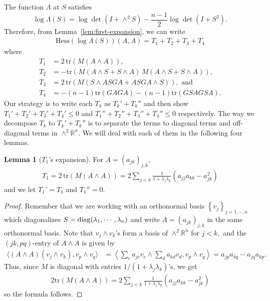 \documentclass[11pt]{amsart}
\numberwithin{equation}{section}
\theoremstyle{definition}
\theoremstyle{definition}
\newtheorem{lemma}[equation]{Lemma}
\newcommand{\pair}[1]{\langle #1\rangle}
\newcommand{\set}[1]{\left\{#1\right\}}
\newcommand{\ppair}[1]{\left\langle #1\right\rangle}
\newcommand{\pr}[1]{\left(#1\right)}
\newcommand{\bb}[1]{\mathbb{#1}} \newcommand{\td}[1]{\widetilde{#1}}
\newcommand{\tr}{\text{tr}}
\newcommand{\Hess}{\text{Hess}}
\begin{document}
The function $\Lambda$ at $S$ satisfies
\[\log \Lambda(S)
= \log \det (I+\wedge^2S)-\frac{n-1}{2}\log\det(I+S^2)
.\]
Therefore, from Lemma~\ref{lem:first-expansion}, we can write
\begin{align*}
\Hess\pr{\log \Lambda(S)}(A, A)=T_1+T_2+T_3+T_4
\end{align*} 
where 
\begin{equation}\label{T-1-T-4}
\begin{split}
T_1
&= 2\,\tr\pr{M (A\wedge A)},\\
T_2
&= - \tr \pr{M (A \wedge S + S \wedge A)\, M (A \wedge S + S \wedge A)},\\
T_3
&=2\,\tr\pr{M (S \wedge A S G A + A S G A \wedge S)},\text{ and}\\
T_4
&=-(n-1) \tr (GAGA) -(n-1) \tr (GSAGSA).
\end{split}
\end{equation}
Our strategy is to write each $T_k$ as $T_k'+ T_k''$ and then show $T_1'+T_2'+T_3'+T_4'\leq 0$ and $T_1''+T_2''+T_3''+T_4''\leq 0$ respectively.
The way we decompose $T_k$ to $T_k'+T_k''$ is to separate the terms to diagonal terms and off-diagonal terms in $\wedge^2\bb R^n.$
We will deal with each of them in the following four lemmas.

\begin{lemma}
	[$T_1$'s expansion]
	\label{lem:T1}
	For $A=(a_{jk})_{j,k},$
	\begin{align*}
	T_1
	= 2\,\tr\pr{M (A\wedge A)}
	= 2 \sum_{j<k} \frac 1{1+\lambda_j\lambda_k} 
	\pr{a_{jj}a_{kk} - a_{jk}^2}
	\end{align*}
	and we let $T_1'=T_1$ and $T_1''=0.$
\end{lemma}

\begin{proof}
	Remember that we are working with an orthonormal basis $\set{v_j}_{j=1,\cdots,n}$ which diagonalizes $S={\rm diag}(\lambda_1,\cdots,\lambda_n)$ and write $A=(a_{jk})_{j,k}$ in the same orthonormal basis.
	Note that $v_j\wedge v_k$'s form a basis of $\wedge^2\bb R^n$ for $j<k,$ and the $(jk,pq)$-entry of $A\wedge A$ is given by
	\begin{align*}
	\pair{(A\wedge A)(v_j\wedge v_k), v_p\wedge v_q}
	& = \ppair{\sum_c a_{jc}v_c\wedge \sum_d a_{kd}v_d, v_p\wedge v_q}
	= a_{jp}a_{kq} - a_{jq}a_{kp}.
	\end{align*}
	Thus, since $M$ is diagonal with entries $1/(1+\lambda_j\lambda_k)$'s, we get
	\begin{align*}
	2 \tr\pr{M(A\wedge A)}
	= 2 \sum_{j<k}
	\frac 1{1+\lambda_j\lambda_k} 
	\pr{a_{jj}a_{kk} - a_{jk}^2}
	\end{align*}
	so the formula follows.
\end{proof}
\end{document}

